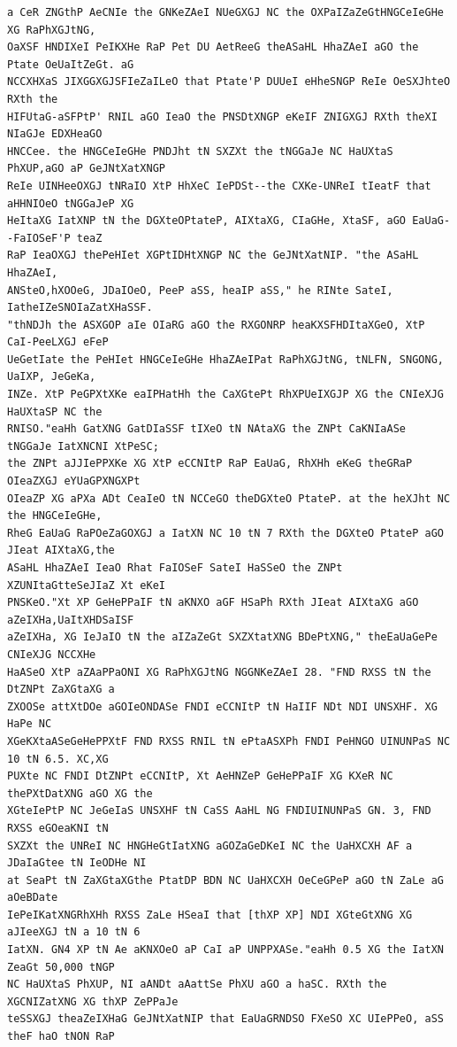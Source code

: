 \documentclass[11pt,a4paper]{article}
\begin{document}
\begin{lstlisting}[style=ciphertext,caption={Complete text after iteration 3}]
a CeR ZNGthP AeCNIe the GNKeZAeI NUeGXGJ NC the OXPaIZaZeGtHNGCeIeGHe XG RaPhXGJtNG,
OaXSF HNDIXeI PeIKXHe RaP Pet DU AetReeG theASaHL HhaZAeI aGO the Ptate OeUaItZeGt. aG
NCCXHXaS JIXGGXGJSFIeZaILeO that Ptate'P DUUeI eHheSNGP ReIe OeSXJhteO RXth the
HIFUtaG-aSFPtP' RNIL aGO IeaO the PNSDtXNGP eKeIF ZNIGXGJ RXth theXI NIaGJe EDXHeaGO
HNCCee. the HNGCeIeGHe PNDJht tN SXZXt the tNGGaJe NC HaUXtaS PhXUP,aGO aP GeJNtXatXNGP
ReIe UINHeeOXGJ tNRaIO XtP HhXeC IePDSt--the CXKe-UNReI tIeatF that aHHNIOeO tNGGaJeP XG
HeItaXG IatXNP tN the DGXteOPtateP, AIXtaXG, CIaGHe, XtaSF, aGO EaUaG--FaIOSeF'P teaZ
RaP IeaOXGJ thePeHIet XGPtIDHtXNGP NC the GeJNtXatNIP. "the ASaHL HhaZAeI,
ANSteO,hXOOeG, JDaIOeO, PeeP aSS, heaIP aSS," he RINte SateI, IatheIZeSNOIaZatXHaSSF.
"thNDJh the ASXGOP aIe OIaRG aGO the RXGONRP heaKXSFHDItaXGeO, XtP CaI-PeeLXGJ eFeP
UeGetIate the PeHIet HNGCeIeGHe HhaZAeIPat RaPhXGJtNG, tNLFN, SNGONG, UaIXP, JeGeKa,
INZe. XtP PeGPXtXKe eaIPHatHh the CaXGtePt RhXPUeIXGJP XG the CNIeXJG HaUXtaSP NC the
RNISO."eaHh GatXNG GatDIaSSF tIXeO tN NAtaXG the ZNPt CaKNIaASe tNGGaJe IatXNCNI XtPeSC;
the ZNPt aJJIePPXKe XG XtP eCCNItP RaP EaUaG, RhXHh eKeG theGRaP OIeaZXGJ eYUaGPXNGXPt
OIeaZP XG aPXa ADt CeaIeO tN NCCeGO theDGXteO PtateP. at the heXJht NC the HNGCeIeGHe,
RheG EaUaG RaPOeZaGOXGJ a IatXN NC 10 tN 7 RXth the DGXteO PtateP aGO JIeat AIXtaXG,the
ASaHL HhaZAeI IeaO Rhat FaIOSeF SateI HaSSeO the ZNPt XZUNItaGtteSeJIaZ Xt eKeI
PNSKeO."Xt XP GeHePPaIF tN aKNXO aGF HSaPh RXth JIeat AIXtaXG aGO aZeIXHa,UaItXHDSaISF
aZeIXHa, XG IeJaIO tN the aIZaZeGt SXZXtatXNG BDePtXNG," theEaUaGePe CNIeXJG NCCXHe
HaASeO XtP aZAaPPaONI XG RaPhXGJtNG NGGNKeZAeI 28. "FND RXSS tN the DtZNPt ZaXGtaXG a
ZXOOSe attXtDOe aGOIeONDASe FNDI eCCNItP tN HaIIF NDt NDI UNSXHF. XG HaPe NC
XGeKXtaASeGeHePPXtF FND RXSS RNIL tN ePtaASXPh FNDI PeHNGO UINUNPaS NC 10 tN 6.5. XC,XG
PUXte NC FNDI DtZNPt eCCNItP, Xt AeHNZeP GeHePPaIF XG KXeR NC thePXtDatXNG aGO XG the
XGteIePtP NC JeGeIaS UNSXHF tN CaSS AaHL NG FNDIUINUNPaS GN. 3, FND RXSS eGOeaKNI tN
SXZXt the UNReI NC HNGHeGtIatXNG aGOZaGeDKeI NC the UaHXCXH AF a JDaIaGtee tN IeODHe NI
at SeaPt tN ZaXGtaXGthe PtatDP BDN NC UaHXCXH OeCeGPeP aGO tN ZaLe aG aOeBDate
IePeIKatXNGRhXHh RXSS ZaLe HSeaI that [thXP XP] NDI XGteGtXNG XG aJIeeXGJ tN a 10 tN 6
IatXN. GN4 XP tN Ae aKNXOeO aP CaI aP UNPPXASe."eaHh 0.5 XG the IatXN ZeaGt 50,000 tNGP
NC HaUXtaS PhXUP, NI aANDt aAattSe PhXU aGO a haSC. RXth the XGCNIZatXNG XG thXP ZePPaJe
teSSXGJ theaZeIXHaG GeJNtXatNIP that EaUaGRNDSO FXeSO XC UIePPeO, aSS theF haO tNON RaP

\end{lstlisting}
\end{document}
